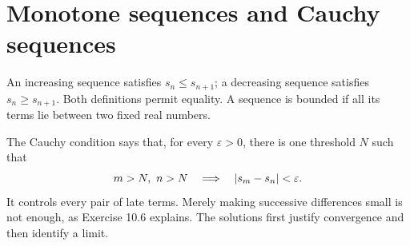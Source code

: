 \section{Monotone sequences and Cauchy sequences}
\label{sec:monotone-cauchy}
An increasing sequence satisfies $s_n\le s_{n+1}$; a decreasing
sequence satisfies $s_n\ge s_{n+1}$. Both definitions permit equality.
A sequence is bounded if all its terms lie between two fixed real numbers.

The Cauchy condition says that, for every $\varepsilon>0$, there is
one threshold $N$ such that
\[
 m>N,\ n>N\quad\Longrightarrow\quad \abs{s_m-s_n}<\varepsilon.
\]
It controls every pair of late terms. Merely making successive
differences small is not enough, as Exercise 10.6 explains.
The solutions first justify convergence and then identify a limit.



